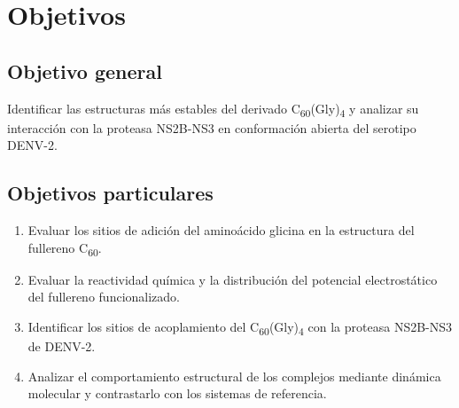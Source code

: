 \titleformat{\chapter}[display]
  {\normalfont\bfseries}{}{0pt}{\Large} %
\chapter{Objetivos}

\section{Objetivo general}
Identificar las estructuras más estables del derivado C\textsubscript{60}(Gly)\textsubscript{4} y analizar su interacción con la proteasa NS2B-NS3 en conformación abierta del serotipo DENV-2.

\section{Objetivos particulares}

\begin{enumerate}
    \item Evaluar los sitios de adición del aminoácido glicina en la estructura del fullereno C\textsubscript{60}.
    \item Evaluar la reactividad química y la distribución del potencial electrostático del fullereno funcionalizado.
    \item Identificar los sitios de acoplamiento del C\textsubscript{60}(Gly)\textsubscript{4} con la proteasa NS2B-NS3 de DENV-2.
    \item Analizar el comportamiento estructural de los complejos mediante dinámica molecular y contrastarlo con los sistemas de referencia.
\end{enumerate}

